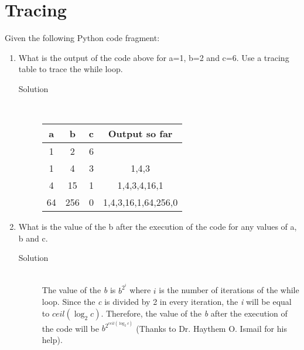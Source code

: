 \documentclass[11pt,a4paper]{article}
\begin{document}
\newpage

\section{Tracing}
Given the following Python code fragment:

\begin{enumerate}[label=(\alph*)]
  \item  What is the output of the code above for a=1, b=2 and c=6. Use a tracing table to trace the while
loop.
\begin{description}
  \item[Solution] \hfill \\
  \begin{tabular}{| c | c | c | c| }
    \hline
    a & b & c & Output so far \\ \hline
    1 & 2 & 6 & \\ \hline
    1 & 4 & 3 & 1,4,3 \\ \hline
    4 & 15 & 1 & 1,4,3,4,16,1 \\ \hline
    64 & 256 & 0 & 1,4,3,16,1,64,256,0 \\ \hline
   \end{tabular}
\end{description}
\item  What is the value of the b after the execution of the code for any values of a, b and c.
\begin{description}
  \item[Solution] \hfill \\
  The value of the \emph{b} is $ b^{2^i} $ where $ i $ is the number of iterations of the while loop.
  Since the \emph{c} is divided by 2 in every iteration, the \emph{i} will be equal to $ ceil(\log_2 c) $. Therefore,
  the value of the \emph{b} after the execution of the code will be $ b^{2^{ceil(\log_2 c)}} $ (Thanks to Dr. Haythem O. Ismail for his help).
\end{description}
\end{enumerate}

\newpage
\end{document}
